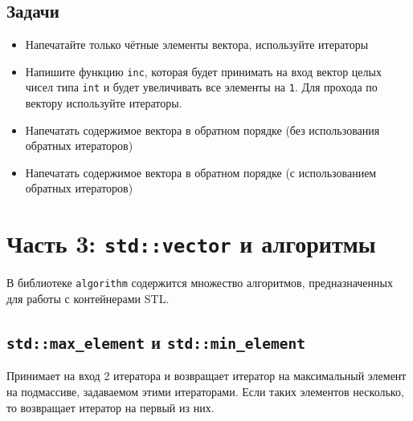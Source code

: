 \documentclass{article}
\begin{document}
\subsection*{Задачи}
\begin{itemize}
\item Напечатайте только чётные элементы вектора, используйте итераторы
\item Напишите функцию \texttt{inc}, которая будет принимать на вход вектор целых чисел типа \texttt{int} и будет увеличивать все элементы на \texttt{1}. Для прохода по вектору используйте итераторы.
\item Напечатать содержимое вектора в обратном порядке (без использования обратных итераторов)
\item Напечатать содержимое вектора в обратном порядке (с использованием обратных итераторов)
\end{itemize}


\newpage
\section*{Часть 3: \texttt{std::vector} и алгоритмы}
В библиотеке \texttt{algorithm} содержится множество алгоритмов, предназначенных для работы с контейнерами STL.
\subsection*{\texttt{std::max\_element} и \texttt{std::min\_element}}
Принимает на вход 2 итератора и возвращает итератор на максимальный элемент на подмассиве, задаваемом этими итераторами. Если таких элементов несколько, то возвращает итератор на первый из них.
\end{document}

